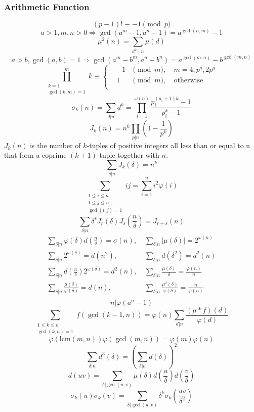 \subsubsection{Arithmetic Function}
\[(p-1)!\equiv-1 \pmod p\]
\[a>1,m,n>0 \Rightarrow \gcd(a^m-1,a^n-1)=a^{\gcd(n,m)}-1\]
\[ \mu^2(n) = \sum_{d^2 \mid n} \mu (d) \]
\[a>b,\gcd(a,b)=1 \Rightarrow \gcd(a^m-b^m,a^n-b^n)=a^{\gcd(m,n)}-b^{\gcd(m,n)}\]
\[ \prod_{\substack{k=1 \\ \gcd(k, m) = 1}}^{m} k \equiv \left\{
\begin{aligned}
&-1 & \pmod m,\ & m = 4, p^q, 2p^q \\
&1 & \pmod m,\ & \text{otherwise} \\
\end{aligned}
\right.
\]
\[ \sigma_k(n) = \sum_{d|n}d^k = \prod_{i=1}^{\omega(n)}\frac{p_i^{(a_i+1)k}-1}{p_i^k-1} \]
\[ J_k(n) = n^k\prod_{p|n}(1-\frac{1}{p^k}) \]
$J_k(n)$ is the number of $k$-tuples of positive integers all less than or equal to n that form a coprime $(k + 1)$-tuple together with $n$.
\[ \sum_{\delta|n}J_k(\delta) = n^k \]
\[ \sum_{\substack{1 \le i \le n \\ 1 \le j \le n \\ \gcd(i,j)=1}} ij = \sum_{i=1}^{n} i^2\varphi(i) \]
\[ \sum_{\delta|n}\delta^sJ_r(\delta)J_s(\frac{n}{\delta}) = J_{r+s}(n) \]
\begin{align*}
\sum_{\delta|n}\varphi(\delta)d\left(\frac{n}{\delta}\right) = \sigma(n),&\ \sum_{\delta|n}\left| \mu(\delta) \right| = 2^{\omega(n)} \\
\sum_{\delta|n}2^{\omega(\delta)} = d(n^2),&\ \sum_{\delta|n}d(\delta^2) = d^2(n) \\
\sum_{\delta|n}d\left(\frac{n}{\delta}\right)2^{\omega(\delta)} = d^2(n),&\ \sum_{\delta|n}\frac{\mu(\delta)}{\delta} = \frac{\varphi(n)}{n} \\
\sum_{\delta|n}\frac{\mu(\delta)}{\varphi(\delta)} = d(n),&\ \sum_{\delta|n}\frac{\mu^2(\delta)}{\varphi(\delta)} = \frac{n}{\varphi(n)} \\
\end{align*}
\[ n|\varphi(a^n-1) \]
\[ \sum_{\substack{1 \leq k \leq n \\ \gcd(k, n) = 1}}f(\gcd(k-1, n)) = \varphi(n)
\sum_{d|n}\frac{(\mu*f)(d)}{\varphi(d)} \]
\[ \varphi(\mathrm{lcm}(m, n))\varphi(\gcd(m,n)) = \varphi(m)\varphi(n) \]
\[ \sum_{\delta|n}d^3(\delta) = \left(\sum_{\delta|n}d(\delta)\right)^2 \]
\[ d(uv) = \sum_{\delta|\gcd(u, v)}\mu(\delta)d(\frac{u}{\delta})d(\frac{v}{\delta}) \]
\[ \sigma_k(u)\sigma_k(v) = \sum_{\delta|\gcd(u, v)}\delta^k\sigma_k(\frac{uv}{\delta^2}) \]
